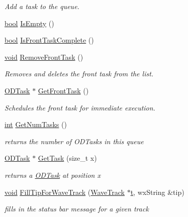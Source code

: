\begin{DoxyCompactItemize}
\begin{DoxyCompactList}\small\item\em Add a task to the queue. \end{DoxyCompactList}\item 
\hyperlink{mac_2config_2i386_2lib-src_2libsoxr_2soxr-config_8h_abb452686968e48b67397da5f97445f5b}{bool} \hyperlink{class_o_d_wave_track_task_queue_a103649c6c70fc522b4d40be235ea8fbb}{Is\+Empty} ()
\item 
\hyperlink{mac_2config_2i386_2lib-src_2libsoxr_2soxr-config_8h_abb452686968e48b67397da5f97445f5b}{bool} \hyperlink{class_o_d_wave_track_task_queue_ab784be325fca9f544c81e1456f9aa317}{Is\+Front\+Task\+Complete} ()
\item 
\hyperlink{sound_8c_ae35f5844602719cf66324f4de2a658b3}{void} \hyperlink{class_o_d_wave_track_task_queue_a5003850e42c56fe77a8fa511b911a216}{Remove\+Front\+Task} ()
\begin{DoxyCompactList}\small\item\em Removes and deletes the front task from the list. \end{DoxyCompactList}\item 
\hyperlink{class_o_d_task}{O\+D\+Task} $\ast$ \hyperlink{class_o_d_wave_track_task_queue_ad9932b0a64d16989df8664acdce516e3}{Get\+Front\+Task} ()
\begin{DoxyCompactList}\small\item\em Schedules the front task for immediate execution. \end{DoxyCompactList}\item 
\hyperlink{xmltok_8h_a5a0d4a5641ce434f1d23533f2b2e6653}{int} \hyperlink{class_o_d_wave_track_task_queue_a66b9e1509e6066969012ec4e1d6ba3be}{Get\+Num\+Tasks} ()
\begin{DoxyCompactList}\small\item\em returns the number of O\+D\+Tasks in this queue \end{DoxyCompactList}\item 
\hyperlink{class_o_d_task}{O\+D\+Task} $\ast$ \hyperlink{class_o_d_wave_track_task_queue_afc3a9b1a81e7ddd54fdb80b076b46c47}{Get\+Task} (size\+\_\+t x)
\begin{DoxyCompactList}\small\item\em returns a \hyperlink{class_o_d_task}{O\+D\+Task} at position x \end{DoxyCompactList}\item 
\hyperlink{sound_8c_ae35f5844602719cf66324f4de2a658b3}{void} \hyperlink{class_o_d_wave_track_task_queue_acb8e8f090235b422276395410eed07d3}{Fill\+Tip\+For\+Wave\+Track} (\hyperlink{class_wave_track}{Wave\+Track} $\ast$\hyperlink{octave__test_8m_aaccc9105df5383111407fd5b41255e23}{t}, wx\+String \&tip)
\begin{DoxyCompactList}\small\item\em fills in the status bar message for a given track \end{DoxyCompactList}\end{DoxyCompactItemize}

